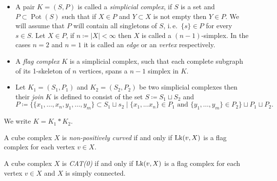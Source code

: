 \begin{defin}
  \begin{itemize}
  \item A pair \(K = (S, P)\) is called a \emph{simplicial complex}, if \(S\) is a set and \(P \subset \operatorname{Pot}(S)\) such that if \(X \in P\) and \(Y \subset X\) is not empty then \(Y \in P\). We will assume that \(P\) will contain all singletons of \(S\), i.\,e.\ \(\{s\} \in P\) for every \(s \in S\). Let \(X \in P\), if \(n \coloneqq |X| < \infty\) then \(X\) is called a \((n-1)\)-simplex. In the cases \(n=2\) and \(n=1\) it is called an \emph{edge} or an \emph{vertex} respectively.
  \item A \emph{flag complex} \(K\) is a simplicial complex, such that each complete subgraph of its 1-skeleton of \(n\) vertices, spans a \(n-1\) simplex in \(K\).
  \item Let \(K_1 = (S_1, P_1)\) and \(K_2 = (S_2, P_2)\) be two simplicial complexes then their \emph{join} \(K\) is defined to consist of the set \(S \coloneqq S_1 \sqcup S_2\) and
    \[
      P \coloneqq \{\{x_1, \dots, x_n, y_1, \dots, y_m\} \subset S_1 \sqcup s_2 \mid \{x_1, \dots x_n\} \in P_1 \text{ and } \{y_1, \dots, y_m\} \in P_2\} \sqcup P_1 \sqcup P_2.
    \]
  \end{itemize}
  We write \(K = K_1 \ast K_2\).
\end{defin}

\begin{thm}
  \label{thm:link}
  A cube complex \(X\) is \emph{non-positively curved} if and only if \(\operatorname{Lk}(v,X)\) is a flag complex for each vertex \(v \in X\).

  A cube complex \(X\) is \emph{CAT(0)} if and only if \(\operatorname{Lk}(v,X)\)  is a flag complex for each vertex \(v \in X\) and \(X\) is simply connected.
\end{thm}

